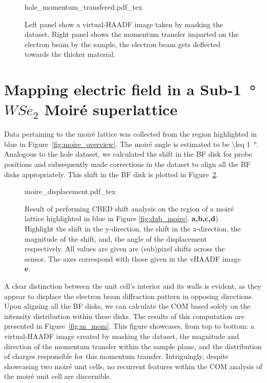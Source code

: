 \begin{figure}
    \centering
    \def\svgwidth{.7\linewidth}
    {hole_momentum_transfered.pdf_tex}
    \caption{Left panel show a virtual-HAADF image taken by masking the dataset. Right panel shows the momentum transfer imparted on the electron beam by the sample, the electron beam gets deflected towards the thicker material.}
    \label{fig:hole_mom}
\end{figure}

\section{Mapping electric field in a Sub-\SI{1}{\degree} $WSe_2$ Moiré superlattice}

Data pertaining to the moiré lattice was collected from the region highlighted in blue in Figure~\ref{fig:moire_overview}.
%
The moiré angle is estimated to be \SI{\leq 1}{\degree}. Analogous to the hole dataset, we calculated the shift in the BF disk for probe positions and subsequently made corrections in the dataset to align all the BF disks appropriately. This shift in the BF disk is plotted in Figure~\ref{fig:m_dis}. 

\begin{figure}[h]
    \centering
    \def\svgwidth{.95\linewidth}
    {moire_displacement.pdf_tex}
    \caption{Result of performing CBED shift analysis on the region of a moiré lattice highlighted in blue in Figure \ref{fig:dub_moire}. \textbf{a,b,c,d}) Highlight the shift in the y-direction, the shift in the x-direction, the magnitude of the shift, and, the angle of the displacement respectively. All values are given are (sub)pixel shifts across the sensor. The axes correspond with those given in the vHAADF image \textbf{e}.}
    \label{fig:m_dis}
\end{figure}

A clear distinction between the unit cell's interior and its walls is evident, as they appear to displace the electron beam diffraction pattern in opposing directions.
%
Upon aligning all the BF disks, we can calculate the COM based solely on the intensity distribution within these disks.
%
The results of this computation are presented in Figure~\ref{fig:m_mom}. 
%
This figure showcases, from top to bottom: a virtual-HAADF image created by masking the dataset, the magnitude and direction of the momentum transfer within the sample plane, and the distribution of charges responsible for this momentum transfer. 
%
Intriguingly, despite showcasing two moiré unit cells, no recurrent features within the COM analysis of the moiré unit cell are discernible.

